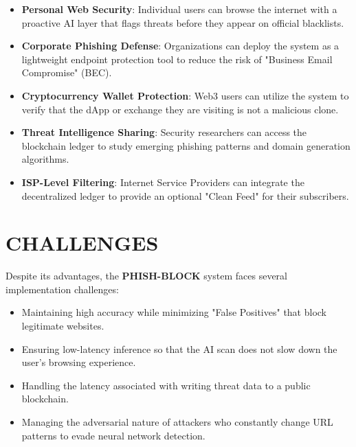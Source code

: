 \begin{itemize}
    \item \textbf{Personal Web Security}: Individual users can browse the internet with a proactive AI layer that flags threats before they appear on official blacklists.
    \item \textbf{Corporate Phishing Defense}: Organizations can deploy the system as a lightweight endpoint protection tool to reduce the risk of "Business Email Compromise" (BEC).
    \item \textbf{Cryptocurrency Wallet Protection}: Web3 users can utilize the system to verify that the dApp or exchange they are visiting is not a malicious clone.
    \item \textbf{Threat Intelligence Sharing}: Security researchers can access the blockchain ledger to study emerging phishing patterns and domain generation algorithms.
    \item \textbf{ISP-Level Filtering}: Internet Service Providers can integrate the decentralized ledger to provide an optional "Clean Feed" for their subscribers.
\end{itemize}



\section{CHALLENGES}

Despite its advantages, the \textbf{PHISH-BLOCK} system faces several implementation challenges:

\begin{itemize}
    \item Maintaining high accuracy while minimizing "False Positives" that block legitimate websites.
    \item Ensuring low-latency inference so that the AI scan does not slow down the user's browsing experience.
    \item Handling the latency associated with writing threat data to a public blockchain.
    \item Managing the adversarial nature of attackers who constantly change URL patterns to evade neural network detection.
\end{itemize}
